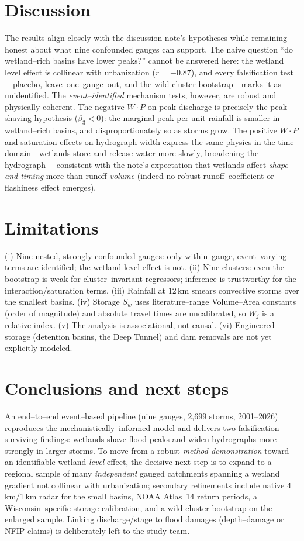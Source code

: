 \documentclass[11pt]{article}
\newcommand{\Wj}{W_{j}}
\begin{document}
\section{Discussion}
The results align closely with the discussion note's hypotheses while remaining honest about
what nine confounded gauges can support. The naive question ``do wetland--rich basins have
lower peaks?'' cannot be answered here: the wetland level effect is collinear with
urbanization ($r=-0.87$), and every falsification test---placebo, leave--one--gauge--out, and
the wild cluster bootstrap---marks it as unidentified. The \emph{event--identified} mechanism
tests, however, are robust and physically coherent. The negative $W\!\cdot\!P$ on peak
discharge is precisely the peak--shaving hypothesis ($\beta_3<0$): the marginal peak per unit
rainfall is smaller in wetland--rich basins, and disproportionately so as storms grow. The
positive $W\!\cdot\!P$ and saturation effects on hydrograph width express the same physics in
the time domain---wetlands store and release water more slowly, broadening the hydrograph---
consistent with the note's expectation that wetlands affect \emph{shape and timing} more than
runoff \emph{volume} (indeed no robust runoff--coefficient or flashiness effect emerges).

\section{Limitations}
(i) Nine nested, strongly confounded gauges: only within--gauge, event--varying terms are
identified; the wetland level effect is not. (ii) Nine clusters: even the bootstrap is weak
for cluster--invariant regressors; inference is trustworthy for the interaction/saturation
terms. (iii) Rainfall at $12$\,km smears convective storms over the smallest basins.
(iv) Storage $S_w$ uses literature--range Volume--Area constants (order of magnitude) and
absolute travel times are uncalibrated, so $\Wj$ is a relative index. (v) The analysis is
associational, not causal. (vi) Engineered storage (detention basins, the Deep Tunnel) and
dam removals are not yet explicitly modeled.

\section{Conclusions and next steps}
An end--to--end event--based pipeline (nine gauges, 2{,}699 storms, 2001--2026) reproduces the
mechanistically--informed model and delivers two falsification--surviving findings: wetlands
shave flood peaks and widen hydrographs more strongly in larger storms. To move from a
robust \emph{method demonstration} toward an identifiable wetland \emph{level} effect, the
decisive next step is to expand to a regional sample of many \emph{independent} gauged
catchments spanning a wetland gradient not collinear with urbanization; secondary refinements
include native 4\,km/1\,km radar for the small basins, NOAA Atlas~14 return periods, a
Wisconsin--specific storage calibration, and a wild cluster bootstrap on the enlarged sample.
Linking discharge/stage to flood damages (depth--damage or NFIP claims) is deliberately left
to the study team.
\end{document}

